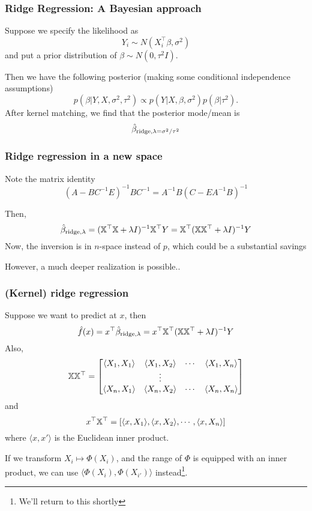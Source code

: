 \documentclass{beamer}
\begin{document}
\begin{frame}[fragile]
\frametitle{Ridge Regression: A Bayesian approach }
Suppose we specify the likelihood as
\[
Y_i \sim N(X_i^{\top}\beta, \sigma^2)
\]
and put a prior distribution of $\beta \sim N(0,\tau^2I)$.

\vsp
Then we have the following posterior (making some conditional independence assumptions)
\[
p(\beta | Y, X, \sigma^2,\tau^2) \propto p(Y | X ,\beta, \sigma^2) p(\beta | \tau^2).
\]
After kernel matching, we find that the posterior mode/mean is
\[
\hat{\beta}_{\textrm{ridge},\lambda = \sigma^2/\tau^2}
\]
\end{frame}


\begin{frame}
\frametitle{Ridge regression in a new space }
Note the matrix identity
\[
(A - BC^{-1}E)^{-1}BC^{-1} = A^{-1} B (C -  EA^{-1}B)^{-1}
\]

Then,
\[
\hat{\beta}_{\textrm{ridge},\lambda} = (\mathbb{X}^{\top} \mathbb{X} + \lambda I)^{-1} \mathbb{X}^{\top} Y = \mathbb{X}^{\top}( \mathbb{X}\mathbb{X}^{\top} + \lambda I)^{-1}Y
\]
Now, the inversion is in $n$-space instead of $p$, which could be a substantial savings
\vsp

However, a much deeper realization is possible..
\end{frame}

\begin{frame}
\frametitle{(Kernel) ridge regression}
Suppose we want to predict at $x$, then 
\[
\hat{f}(x) = x^{\top}\hat{\beta}_{\textrm{ridge},\lambda} =  x^{\top}\mathbb{X}^{\top}( \mathbb{X}\mathbb{X}^{\top} + \lambda I)^{-1}Y
\]
Also,
\[
\mathbb{X}\mathbb{X}^{\top} = 
\begin{bmatrix}
\langle X_1, X_1 \rangle & \langle X_1, X_2 \rangle & \cdots & \langle X_1, X_n \rangle \\
& \vdots && \\
\langle X_n, X_1 \rangle & \langle X_n, X_2 \rangle & \cdots & \langle X_n, X_n \rangle
\end{bmatrix}
\]
and
\[
x^{\top}\mathbb{X}^{\top} = [\langle x, X_1 \rangle,  \langle x, X_2 \rangle, \cdots, \langle x, X_n \rangle]
\]
where $\langle x,x' \rangle$ is the Euclidean inner product.

\vsp
If we transform $X_i \mapsto \Phi(X_i)$, and the range of $\Phi$ is equipped with an inner product, we can use
$\langle \Phi(X_i), \Phi(X_{i'}) \rangle$ instead\footnote{We'll return to this shortly}.  
\end{frame}


\end{document}
